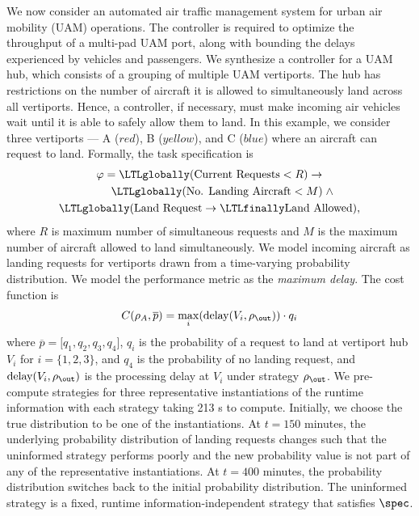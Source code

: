 We now consider an automated air traffic management system for urban air mobility (UAM) operations. The controller is required to optimize the throughput of a multi-pad UAM port, along with bounding the delays experienced by vehicles and passengers. We synthesize a controller for a UAM hub, which consists of a grouping of multiple UAM vertiports. The hub has restrictions on the number of aircraft it is allowed to simultaneously land across all vertiports. Hence, a controller, if necessary, must make incoming air vehicles wait until it is able to safely allow them to land. In this example, we consider three vertiports --- A ($red$), B ($yellow$), and C ($blue$) where an aircraft can request to land. Formally, the task specification is
\vspace{-0.12cm}
\begin{multline*}
    \varphi = \LTLglobally (\text{Current Requests} < R) 
\rightarrow \\ \qquad\;\LTLglobally (\text{No. Landing Aircraft} < M) \; \wedge \\ \LTLglobally (\text{Land Request} \rightarrow \LTLfinally \text{Land Allowed}),
\end{multline*}
where $R$ is maximum number of simultaneous requests and $M$ is the maximum number of aircraft allowed to land simultaneously. We model incoming aircraft as landing requests for vertiports drawn from a time-varying probability distribution. We model the performance metric as the \emph{maximum delay}. The cost function is
\begin{align}
C(\rho_A,\overline{p}) = \max_i(\text{delay}(V_i,\rho_\out))\cdot q_i\label{eq:cost_UAM}
\end{align}
where $\overline{p} = \lbrack q_1 , q_2,q_3,q_4 \rbrack$, $q_i$ is the probability of a request to land at vertiport hub $V_i$ for $i=\{1,2,3\}$, and $q_4$ is the probability of no landing request, and $\text{delay}(V_i,\rho_\out)$ is the processing delay at $V_i$ under strategy $\rho_\out$. We pre-compute strategies for three representative instantiations of the runtime information with each strategy taking 213 s to compute.
Initially, we choose the true distribution to be one of the instantiations. At $t=150$ minutes, the underlying probability distribution of landing requests changes such that the uninformed strategy performs poorly and the new probability value is not part of any of the representative instantiations. At $t=400$ minutes, the probability distribution switches back to the initial probability distribution. The uninformed strategy is a fixed, runtime information-independent strategy that satisfies $\spec$.

